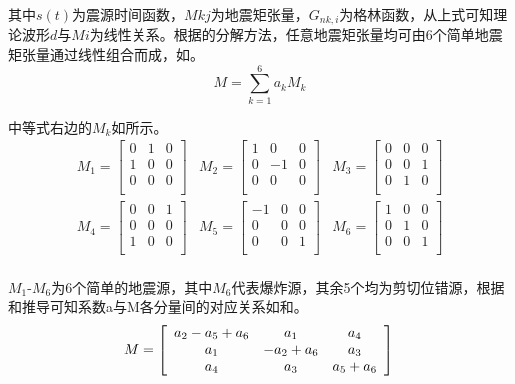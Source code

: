 其中$s(t)$为震源时间函数，$Mkj$为地震矩张量，$G_{nk,i}$为格林函数，从上式可知理论波形$d$与$Mi$为线性关系。根据\citet{Kikuchi1991}的分解方法，任意地震矩张量均可由6个简单地震矩张量通过线性组合而成，如。
\begin{equation}
\label{eq2_02}
M=\sum_{k=1}^6a_kM_k
\end{equation}

中等式右边的$M_k$如所示。
\begin{equation}
\label{eq2_03}
\begin{array}{ccc}
M_1=\left[\begin{array}{ccc}
0 & 1 & 0\\
1 & 0 & 0\\
0 & 0 & 0\\
\end{array}\right]&
M_2=\left[\begin{array}{ccc}
1 & 0 & 0\\
0 & -1 & 0\\
0 & 0 & 0\\
\end{array}\right]&
M_3=\left[\begin{array}{ccc}
0 & 0 & 0\\
0 & 0 & 1\\
0 & 1 & 0\\
\end{array}\right]\\
M_4=\left[\begin{array}{ccc}
0 & 0 & 1\\
0 & 0 & 0\\
1 & 0 & 0\\
\end{array}\right]&
M_5=\left[\begin{array}{ccc}
-1 & 0 & 0\\
0 & 0 & 0\\
0 & 0 & 1\\
\end{array}\right]&
M_6=\left[\begin{array}{ccc}
1 & 0 & 0\\
0 & 1 & 0\\
0 & 0 & 1\\
\end{array}\right]\\
\end{array}
\end{equation}

$M_1$-$M_6$为6个简单的地震源，其中$M_6$代表爆炸源，其余5个均为剪切位错源，根据和推导可知系数a与M各分量间的对应关系如和。
\begin{equation}
\label{eq2_04}
M=\left[\begin{array}{ccc}
a_2-a_5+a_6 & a_1 & a_4\\
a_1 & -a_2+a_6 & a_3\\
a_4 & a_3 & a_5+a_6\\
\end{array}\right]\\
\end{equation}

